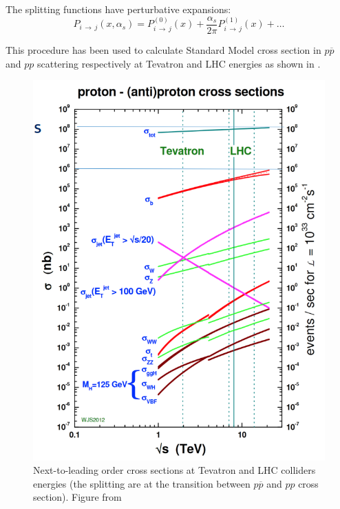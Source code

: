 The splitting functions have perturbative expansions: 
\begin{equation}
	P_{i\,\rightarrow\,j}(x,\alpha_s)=P_{i\,\rightarrow\,j}^{(0)}(x)+\frac{\alpha_s}{2\pi}P_{i\,\rightarrow\,j}^{(1)}(x)+\dots
\end{equation}

This procedure has been used to calculate Standard Model cross section in $p\overline{p}$ and $pp$ scattering respectively at Tevatron and LHC energies as shown in .

\begin{figure}[!ht]
	\centering 
	\includegraphics[width=12cm]{img/StandardModelCrossSections_color.png}
	\caption{Next-to-leading order cross sections at Tevatron and LHC colliders energies (the splitting are at the transition between $p\overline{p}$ and $pp$ cross section). Figure from \cite{StirlingPrivate}}
	\label{figure:StandardModelCrossSections}
\end{figure}


